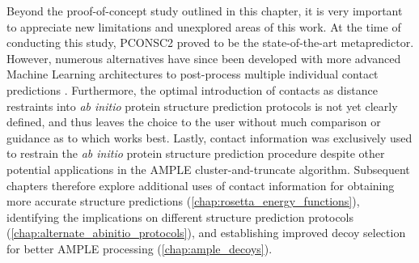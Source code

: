 Beyond the proof-of-concept study outlined in this chapter, it is very important to appreciate new limitations and unexplored areas of this work. At the time of conducting this study, PCONSC2 proved to be the state-of-the-art metapredictor. However, numerous alternatives have since been developed with more advanced Machine Learning architectures to post-process multiple individual contact predictions \cite[e.g.,][]{Jones2015-vq,Ovchinnikov2015-tn}. Furthermore, the optimal introduction of contacts as distance restraints into \textit{ab initio} protein structure prediction protocols is not yet clearly defined, and thus leaves the choice to the user without much comparison or guidance as to which works best. Lastly, contact information was exclusively used to restrain the \textit{ab initio} protein structure prediction procedure despite other potential applications in the AMPLE cluster-and-truncate algorithm. Subsequent chapters therefore explore additional uses of contact information for obtaining more accurate structure predictions (\cref{chap:rosetta_energy_functions}), identifying the implications on different structure prediction protocols (\cref{chap:alternate_abinitio_protocols}), and establishing improved decoy selection for better AMPLE processing (\cref{chap:ample_decoys}).
